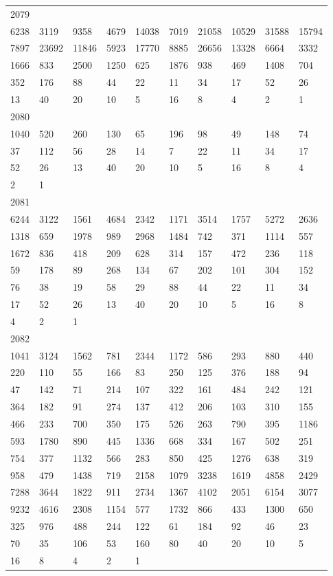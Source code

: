 \begin{longtable}{*{10}{l}}
2079&&&&&&&&&\\
6238& 3119& 9358& 4679& 14038& 7019& 21058& 10529& 31588& 15794\\
7897& 23692& 11846& 5923& 17770& 8885& 26656& 13328& 6664& 3332\\
1666& 833& 2500& 1250& 625& 1876& 938& 469& 1408& 704\\
352& 176& 88& 44& 22& 11& 34& 17& 52& 26\\
13& 40& 20& 10& 5& 16& 8& 4& 2& 1\\

2080&&&&&&&&&\\
1040& 520& 260& 130& 65& 196& 98& 49& 148& 74\\
37& 112& 56& 28& 14& 7& 22& 11& 34& 17\\
52& 26& 13& 40& 20& 10& 5& 16& 8& 4\\
2& 1& \\

2081&&&&&&&&&\\
6244& 3122& 1561& 4684& 2342& 1171& 3514& 1757& 5272& 2636\\
1318& 659& 1978& 989& 2968& 1484& 742& 371& 1114& 557\\
1672& 836& 418& 209& 628& 314& 157& 472& 236& 118\\
59& 178& 89& 268& 134& 67& 202& 101& 304& 152\\
76& 38& 19& 58& 29& 88& 44& 22& 11& 34\\
17& 52& 26& 13& 40& 20& 10& 5& 16& 8\\
4& 2& 1& \\

2082&&&&&&&&&\\
1041& 3124& 1562& 781& 2344& 1172& 586& 293& 880& 440\\
220& 110& 55& 166& 83& 250& 125& 376& 188& 94\\
47& 142& 71& 214& 107& 322& 161& 484& 242& 121\\
364& 182& 91& 274& 137& 412& 206& 103& 310& 155\\
466& 233& 700& 350& 175& 526& 263& 790& 395& 1186\\
593& 1780& 890& 445& 1336& 668& 334& 167& 502& 251\\
754& 377& 1132& 566& 283& 850& 425& 1276& 638& 319\\
958& 479& 1438& 719& 2158& 1079& 3238& 1619& 4858& 2429\\
7288& 3644& 1822& 911& 2734& 1367& 4102& 2051& 6154& 3077\\
9232& 4616& 2308& 1154& 577& 1732& 866& 433& 1300& 650\\
325& 976& 488& 244& 122& 61& 184& 92& 46& 23\\
70& 35& 106& 53& 160& 80& 40& 20& 10& 5\\
16& 8& 4& 2& 1& \\


\end{longtable}

